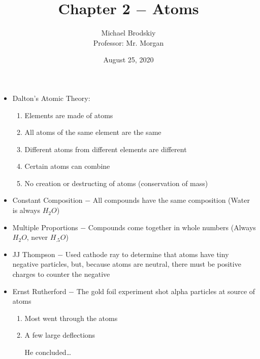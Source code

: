 \documentclass[12pt]{article}
\title{Chapter 2 $-$ Atoms}
\date{August 25, 2020}
\author{Michael Brodskiy\\ \small Professor: Mr. Morgan}
\begin{document}
\maketitle

\begin{itemize}

  \item Dalton's Atomic Theory:

    \begin{enumerate}

      \item Elements are made of atoms

      \item All atoms of the same element are the same

      \item Different atoms from different elements are different

      \item Certain atoms can combine

      \item No creation or destructing of atoms (conservation of mass)

    \end{enumerate}

  \item Constant Composition $-$ All compounds have the same composition (Water is always $H_2O$)

  \item Multiple Proportions $-$ Compounds come together in whole numbers  (Always $H_2O$, never $H_{.5}O$)

  \item JJ Thompson $-$ Used cathode ray to determine that atoms have tiny negative particles, but, because atoms are neutral, there must be positive charges to counter the negative

  \item Ernst Rutherford $-$ The gold foil experiment shot alpha particles at source of atoms
    
    \begin{enumerate}

      \item Most went through the atoms

      \item A few large deflections

        \begin{center} He concluded\dots\end{center}


\end{enumerate}
\end{itemize}
\end{document}
